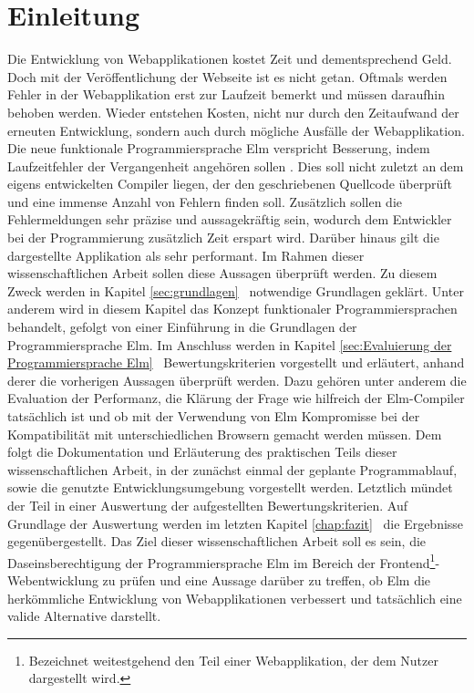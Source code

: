 \chapter{Einleitung}
\label{sec:einleitung}
Die Entwicklung von Webapplikationen kostet Zeit und dementsprechend Geld. Doch mit der Veröffentlichung der Webseite ist es nicht getan. Oftmals werden Fehler in der Webapplikation erst zur Laufzeit bemerkt und müssen daraufhin behoben werden. Wieder entstehen Kosten, nicht nur durch den Zeitaufwand der erneuten Entwicklung, sondern auch durch mögliche Ausfälle der Webapplikation. Die neue funktionale Programmiersprache Elm verspricht Besserung, indem Laufzeitfehler der Vergangenheit angehören sollen \cite[Vgl. f.]{elm-no-runtime-errors}. Dies soll nicht zuletzt an dem eigens entwickelten Compiler liegen, der den geschriebenen Quellcode überprüft und eine immense Anzahl von Fehlern finden soll. Zusätzlich sollen die Fehlermeldungen sehr präzise und aussagekräftig sein, wodurch dem Entwickler bei der Programmierung zusätzlich Zeit erspart wird. Darüber hinaus gilt die dargestellte Applikation als sehr performant.
Im Rahmen dieser wissenschaftlichen Arbeit sollen diese Aussagen überprüft werden. Zu diesem Zweck werden in Kapitel \ref{sec:grundlagen} \glqq{}\grqq~notwendige Grundlagen geklärt. Unter anderem wird in diesem Kapitel das Konzept funktionaler Programmiersprachen behandelt, gefolgt von einer Einführung in die Grundlagen der Programmiersprache Elm. Im Anschluss werden in Kapitel \ref{sec:Evaluierung der Programmiersprache Elm} \glqq{}\grqq~Bewertungskriterien vorgestellt und erläutert, anhand derer die vorherigen Aussagen überprüft werden. Dazu gehören unter anderem die Evaluation der Performanz, die Klärung der Frage wie hilfreich der Elm-Compiler tatsächlich ist und ob mit der Verwendung von Elm Kompromisse bei der Kompatibilität mit unterschiedlichen Browsern gemacht werden müssen. Dem folgt die Dokumentation und Erläuterung des praktischen Teils dieser wissenschaftlichen Arbeit, in der zunächst einmal der geplante Programmablauf, sowie die genutzte Entwicklungsumgebung vorgestellt werden.  Letztlich mündet der Teil in einer Auswertung der aufgestellten Bewertungskriterien. Auf Grundlage der Auswertung werden im letzten Kapitel \ref{chap:fazit} \glqq{}\grqq~die Ergebnisse gegenübergestellt. Das Ziel dieser wissenschaftlichen Arbeit soll es sein, die Daseinsberechtigung der Programmiersprache Elm im Bereich der Frontend\footnote{Bezeichnet weitestgehend den Teil einer Webapplikation, der dem Nutzer dargestellt wird.}-Webentwicklung zu prüfen und eine Aussage darüber zu treffen, ob Elm die herkömmliche Entwicklung von Webapplikationen verbessert und tatsächlich eine valide Alternative darstellt.